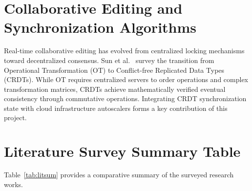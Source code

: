 \documentclass[12pt,a4paper]{report}
\begin{document}
\section{Collaborative Editing and Synchronization Algorithms}
Real-time collaborative editing has evolved from centralized locking mechanisms toward decentralized consensus. Sun et al.~\cite{crdtsurvey} survey the transition from Operational Transformation (OT) to Conflict-free Replicated Data Types (CRDTs). While OT requires centralized servers to order operations and complex transformation matrices, CRDTs achieve mathematically verified eventual consistency through commutative operations. Integrating CRDT synchronization state with cloud infrastructure autoscalers forms a key contribution of this project.

\clearpage
\section{Literature Survey Summary Table}
Table~\ref{tab:litsum} provides a comparative summary of the surveyed research works.
\end{document}
